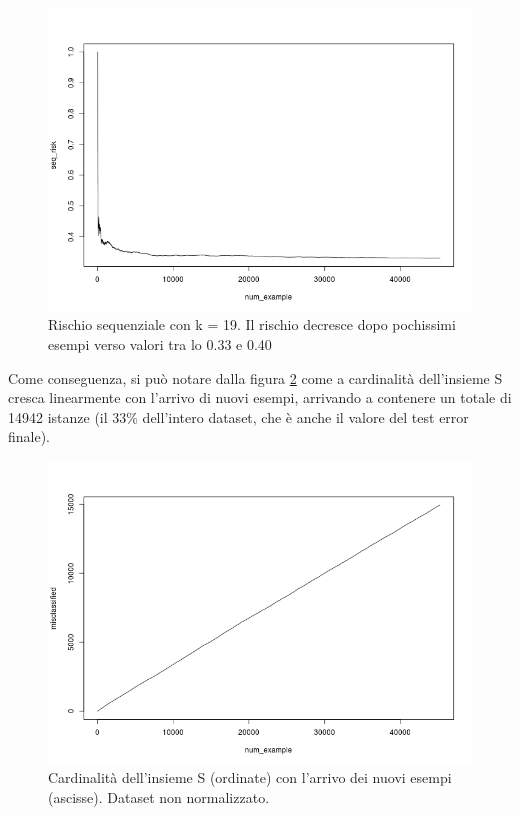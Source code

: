 \documentclass[fleqn,10pt]{SelfArx} %
\begin{document}
\begin{figure}
\includegraphics[scale=0.35]{knn_online_wo_norm/seq_risk_final.png}
\caption{\footnotesize{Rischio sequenziale con k = 19. Il rischio decresce dopo pochissimi esempi verso valori tra lo 0.33 e 0.40}}
\label{cross:seqrisk}
\end{figure}
Come conseguenza, si può notare dalla figura \ref{cross:misclass} come a cardinalità dell'insieme S cresca linearmente con l'arrivo di nuovi esempi, arrivando a contenere un totale di 14942 istanze (il 33\% dell'intero dataset, che è anche il valore del test error finale).

\begin{figure}
\includegraphics[scale=0.30]{knn_online_wo_norm/misclassified_final.png}
\caption{\footnotesize{Cardinalità dell'insieme S (ordinate) con l'arrivo dei nuovi esempi (ascisse). Dataset non normalizzato.}}
\label{cross:misclass}
\end{figure}
\end{document}
